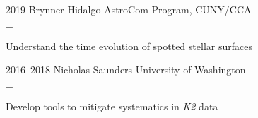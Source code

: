 \documentclass[]{luger-cv} %
\begin{document}
\begin{entrylist}
    \entry
    {2019}
    {Brynner Hidalgo}
    {AstroCom Program, CUNY/CCA}
    {%
        \vspace{-1em}
        \begin{list}{{\color{numcolor}$-$}}{\cvlist}
            \item Understand the time evolution of spotted stellar surfaces
        \end{list}
    }

    \entry
    {2016--2018}
    {Nicholas Saunders}
    {University of Washington}
    {%
        \vspace{-1em}
        \begin{list}{{\color{numcolor}$-$}}{\cvlist}
            \item Develop tools to mitigate systematics in \emph{K2} data
        \end{list}
    }


\end{entrylist}

\clearpage

\end{document}
